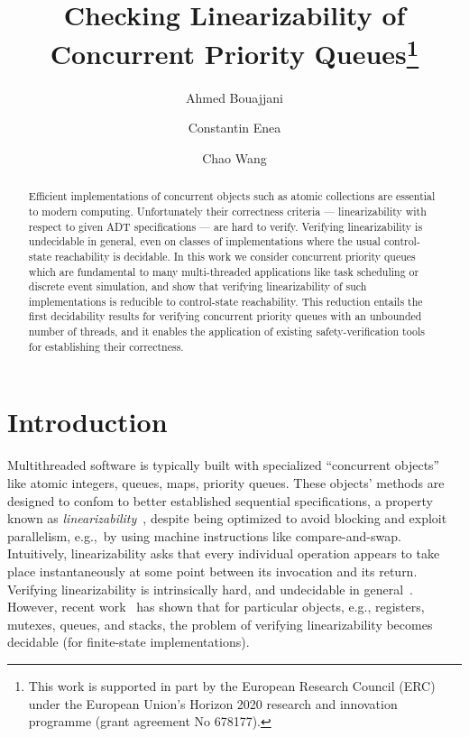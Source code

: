\documentclass[a4paper,UKenglish]{lipics-v2016}
\title{Checking Linearizability of Concurrent Priority Queues\footnote{This work is supported in part by the European Research Council (ERC) under the
European Union's Horizon 2020 research and innovation programme (grant agreement No 678177).}}
\author[1]{Ahmed Bouajjani}
\author[1]{Constantin Enea}
\author[1]{Chao Wang}
\affil[1]{IRIF, University Paris Diderot, Paris, France \\ \texttt{\{abou,cenea,wangch\}@irif.fr}}
\newcommand{\forget}[1]{}
\begin{document}
\maketitle

\begin{abstract}
Efficient implementations of concurrent objects such as atomic collections are essential to modern computing. Unfortunately their correctness criteria — linearizability with respect to given ADT specifications — are hard to verify. Verifying linearizability is undecidable in general, even on classes of implementations where the usual control-state reachability is decidable. In this work we consider concurrent priority queues which are fundamental to many multi-threaded applications like task scheduling or discrete event simulation, and show that verifying linearizability of such implementations is reducible to control-state reachability. This reduction entails the first decidability results for verifying concurrent priority queues with an unbounded number of threads, and it enables the application of existing safety-verification tools for establishing their correctness.
\end{abstract}

\forget{
\noindent Keywords: weak memory model, $\textit{linearizability}$,
$\textit{TSO-to-TSO linearizability}$
}

 
\section{Introduction}
\label{sec:introduction}






 Multithreaded software is typically built with specialized “concurrent
  objects” like atomic integers, queues, maps, priority queues. These objects’ methods are
  designed to confom to better established sequential specifications, a property known as \emph{linearizability}~\cite{journals/toplas/HerlihyW90},
  despite being optimized to avoid blocking and exploit parallelism, e.g.,~by
  using machine instructions like compare-and-swap. Intuitively, linearizability asks that every individual operation appears to take place instantaneously at some point between its invocation and its return. Verifying linearizability is intrinsically hard, and undecidable in general~\cite{conf/esop/BouajjaniEEH13}. 
However, recent work~\cite{DBLP:conf/icalp/BouajjaniEEH15} has shown that for particular objects,
e.g., registers, mutexes, queues, and stacks, the problem of verifying linearizability becomes decidable (for finite-state implementations).
\end{document}
